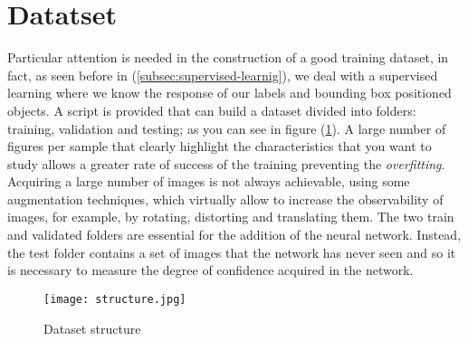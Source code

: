 \section{Datatset}
\label{sec:dataset}
Particular attention is needed in the construction of a good training dataset, 
in fact, as seen before in (\ref{subsec:supervised-learnig}), we deal with a
supervised learning where we know the response of our labels and bounding box
positioned objects. A script is provided that can build a dataset divided into
folders: training, validation and testing; as you can see in figure
(\ref{fig:datasetstructure}).
A large number of figures per sample that clearly highlight the characteristics
that you want to study allows a greater rate of success of the training
preventing the \emph{overfitting}.
Acquiring a large number of images is not always achievable, using some
augmentation techniques, which virtually allow to increase the observability of
images, for example, by rotating, distorting and translating them. 
The two train and validated folders are essential for the addition of the neural
network. Instead, the test folder contains a set of images that the network has
never seen and so it is necessary to measure the degree of confidence acquired
in the network.\linebreak
%
\begin{figure}[htb]
	\centering
	\texttt{[image: structure.jpg]}
	\caption{Dataset structure}
	\label{fig:datasetstructure}
\end{figure}
%
